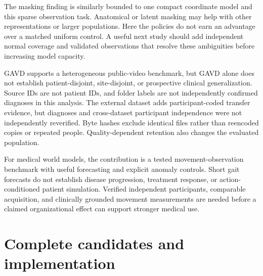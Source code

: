 \documentclass[letterpaper]{article}
\begin{document}
The masking finding is similarly bounded to one compact coordinate model and this sparse observation task. Anatomical or latent masking may help with other representations or larger populations. Here the policies do not earn an advantage over a matched uniform control. A useful next study should add independent normal coverage and validated observations that resolve these ambiguities before increasing model capacity.

GAVD supports a heterogeneous public-video benchmark, but GAVD alone does not establish patient-disjoint, site-disjoint, or prospective clinical generalization. Source IDs are not patient IDs, and folder labels are not independently confirmed diagnoses in this analysis. The external dataset adds participant-coded transfer evidence, but diagnoses and cross-dataset participant independence were not independently reverified. Byte hashes exclude identical files rather than reencoded copies or repeated people. Quality-dependent retention also changes the evaluated population.

For medical world models, the contribution is a tested movement-observation benchmark with useful forecasting and explicit anomaly controls. Short gait forecasts do not establish disease progression, treatment response, or action-conditioned patient simulation. Verified independent participants, comparable acquisition, and clinically grounded movement measurements are needed before a claimed organizational effect can support stronger medical use.



\clearpage

\appendix

\section{Complete candidates and implementation}
\end{document}
